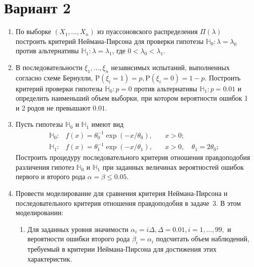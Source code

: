 \documentclass[a4paper,14pt]{extreport}
\renewcommand{\=}[1]{\stackrel{#1}{=}} %
\newcommand{\Proba}{\mathrm{P}}
\begin{document}
\newpage 

\section*{Вариант 2}


\begin{enumerate}


    \item По выборке $(X_1, \ldots, X_n)$ из
    пуассоновского распределения $\Pi(\lambda)$
    построить критерий Неймана-Пирсона 
    для проверки гипотезы $\mathbb{H}_0: \lambda = \lambda_0$
    против альтернативы $\mathbb{H}_1: \lambda = \lambda_1$,
    где $0 < \lambda_0 < \lambda_1$.

    \item В последовательности $\xi_1, \ldots, \xi_n$
    независимых испытаний, выполненных согласно
    схеме Бернулли, $\Proba(\xi_i = 1) = p, 
    \Proba(\xi_i = 0) = 1 - p$. Построить
    критерий проверки гипотезы $\mathbb{H}_0: p = 0$
    против альтернативы $\mathbb{H}_1: p = 0.01$
    и определить наименьший объем выборки, 
    при котором вероятности ошибок 1 и 2 родов
    не превышают $0.01$.

    \item Пусть гипотезы $\mathbb{H}_0$ и $\mathbb{H}_1$ имеют вид
    \begin{eqnarray*}
    \mathbb{H}_0: &f(x) =
        \theta_0^{-1} \exp(-x/\theta_0), & \quad x > 0;\\
    \mathbb{H}_1: &f(x) = \theta_1^{-1} \exp(-x/\theta_1),& 
        \quad  x > 0, \quad \theta_1 = 2\theta_0;
    \end{eqnarray*}
    Построить процедуру последовательного критерия
    отношения правдоподобия различения
    гипотез $\mathbb{H}_0$ и $\mathbb{H}_1$
    при заданных величинах вероятностей ошибок
    первого и второго рода $\alpha = \beta \leqslant 0.05$.

    \item Провести моделирование для сравнения
    критерия Неймана-Пирсона и последовательного 
    критерия отношения правдоподобия в задаче~3.
    В этом моделировании:
    \begin{enumerate}
        \item Для заданных уровня значимости
        $\alpha_i = i\Delta,
        \Delta = 0.01, i = 1, \ldots, 99,$
        и вероятности ошибки второго рода 
        $\beta_i = \alpha_i$ подсчитать 
        объем наблюдений, требуемый в критерии 
        Неймана-Пирсона для достижения этих
        характеристик.


\end{enumerate}
\end{enumerate}
\end{document}
